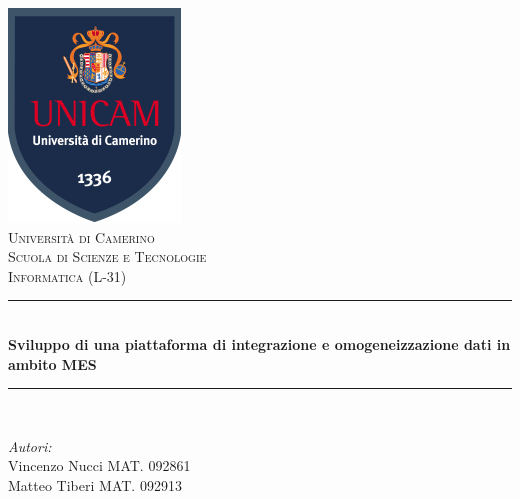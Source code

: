 \begin{titlepage}
	
\newcommand{\HRule}{\rule{\linewidth}{0.5mm}} %
\renewcommand{\contentsname}{Indice}
\center %
 
\includegraphics{logo.png}\\[1cm] %
\textsc{\LARGE Università di Camerino}\\[1.5cm] %
\textsc{\Large Scuola di Scienze e Tecnologie}\\[0.5cm] %
\textsc{\large Informatica (L-31)}\\[0.5cm] %


\HRule \\[0.4cm]
{ \huge \bfseries Sviluppo di una piattaforma di integrazione e omogeneizzazione dati in ambito MES}\\[0.4cm] %
\HRule \\[1.5cm]
 

\begin{minipage}{0.4\textwidth}
\begin{flushleft} \large
\emph{Autori:}\\
Vincenzo Nucci MAT. 092861 \\
Matteo Tiberi MAT. 092913
\end{flushleft}
\end{minipage}



\end{titlepage}
